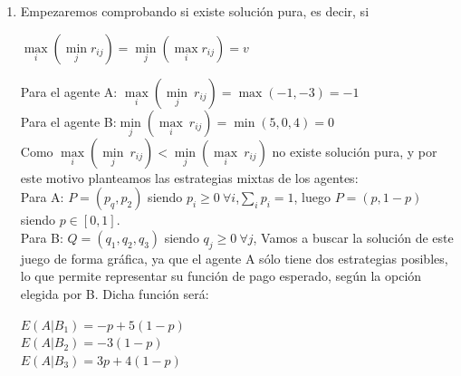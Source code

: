 \begin{enumerate}

    \item Empezaremos comprobando si existe solución pura, es decir, si
    \begin{center}
        $\underset{i}{\max}(\underset{j}{\min}r_{ij})=\underset{j}{\min}(\underset{i}{\max}r_{ij})=v$\\
    \end{center}
Para el agente A: $\underset{i}{\max}(\underset{j}{\min}\:r_{ij})= \max(-1,-3)=-1$\\
Para el agente B:$\underset{j}{\min}(\underset{i}{\max}\:r_{ij})= \min(5,0,4)=0$ \\
\vspace{2mm}
Como $\underset{i}{\max}(\underset{j}{\min}\:r_{ij})<\underset{j}{\min}(\underset{i}{\max}\:r_{ij})$ no existe solución pura, y por este motivo planteamos las estrategias mixtas de los agentes:\\
\vspace{2mm}
Para A: $P=(p_q,p_2)$ siendo  $p_i\geq0 \: \forall i$,$ \underset{i}{\sum}p_i = 1$,  luego $P=(p,1-p)$ siendo $p \in [0,1]$.\\
\vspace{2mm}
Para B: $Q=(q_1,q_2,q_3)$ siendo $q_j\geq 0 \: \forall j$,  Vamos a buscar la solución de este juego de forma gráfica, ya que el agente A sólo tiene dos estrategias posibles, lo que permite representar su función de pago esperado, según la opción elegida por B. Dicha función será:

\begin{center}
    $E(A|B_1)=-p+5(1-p)$\\
    $E(A|B_2)=-3(1-p)$\\
    $E(A|B_3)=3p+4(1-p)$\\
\end{center}


\end{enumerate}
